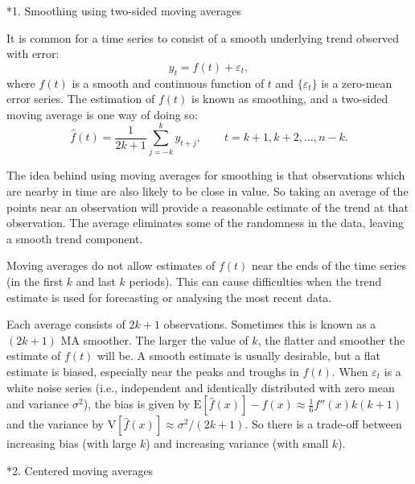 \documentclass[10pt]{article}
\makeatletter
\newcommand{\E}{\text{E}}
\newcommand{\var}{\text{V}}
\renewcommand{\section}%
{\@startsection{section}{1}{0mm}{\baselineskip}{0.5\baselineskip}{\normalfont\large\rmfamily\bfseries}}
\makeatother
\begin{document}
\section*{1. Smoothing using two-sided moving averages}

It is common for a time series to consist of a smooth underlying trend observed with error:
\[
y_t = f(t) + \varepsilon_t,
\]
where $f(t)$ is a smooth and continuous function of $t$ and $\{\varepsilon_t\}$ is a zero-mean error series. The estimation of $f(t)$ is known as smoothing, and a two-sided moving average is one way of doing so:
\[
\hat{f}(t) = \frac{1}{2k+1}\sum_{j=-k}^{k} y_{t+j}, \qquad t=k+1,k+2,\dots,n-k.
\]

The idea behind using moving averages for smoothing is that observations which are nearby in time are also likely to be close in value. So taking an average of the points near an observation will provide a reasonable estimate of the trend at that observation.  The average eliminates some of the randomness in the data, leaving a smooth trend component.

Moving averages do not allow estimates of $f(t)$ near the ends of the time series (in the first $k$ and last $k$ periods). This can cause difficulties when the trend estimate is used for forecasting or analysing the most recent data.

Each average consists of $2k+1$ observations. Sometimes this is known as a $(2k+1)$ MA smoother. The larger the value of $k$, the flatter and smoother the estimate of $f(t)$ will be. A smooth estimate is usually desirable, but a flat estimate is biased, especially near the peaks and troughs in $f(t)$. When $\varepsilon_t$ is a white noise series (i.e., independent and identically distributed with zero mean and variance $\sigma^2$), the bias is given by $\E[\hat{f}(x)]-f(x) \approx \frac16 f''(x) k(k+1)$ and the variance by  $\var[\hat{f}(x)] \approx \sigma^2/(2k+1)$.
So there is a trade-off between increasing bias (with large $k$) and increasing variance (with small $k$).

\section*{2. Centered moving averages}
\end{document}
